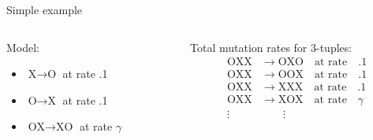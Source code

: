 \documentclass[smaller]{beamer}
\begin{document}
\begin{frame}{Simple example}

  \begin{columns}[c]
    \begin{column}{.5\textwidth}
        Model:
  \begin{itemize}
    \item $\text{X} \to \text{O}$ at rate .1
    \item $\text{O} \to \text{X}$ at rate .1
    \item $\text{OX} \to \text{XO}$ at rate $\gamma$
  \end{itemize}

    \end{column}
    \begin{column}{.5\textwidth}

      Total mutation rates for 3-tuples:
      \begin{align*}
          \text{OXX} &\to \text{OXO} \quad \text{at rate} \quad .1 \\
          \text{OXX} &\to \text{OOX} \quad \text{at rate} \quad .1 \\
          \text{OXX} &\to \text{XXX} \quad \text{at rate} \quad .1 \\
          \text{OXX} &\to \text{XOX} \quad \text{at rate} \quad \gamma \\
          \vdots &\qquad \vdots
      \end{align*}

    \end{column}
  \end{columns}


\end{frame}
\end{document}
